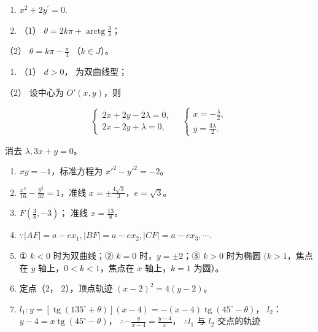 \begin{enumerate}
\def\labelenumi{\arabic{enumi}.}
\item
  \(x^{2} + 2y^{\prime} = 0.\)
\item
  （1） \(\theta = 2k\pi + \operatorname{arctg} \frac{3}{4}\)；
\end{enumerate}

（2） \(\theta = k\pi - \frac{\pi}{4}\) （\(k \in J\)）。

\begin{enumerate}
\def\labelenumi{\arabic{enumi}.}
\setcounter{enumi}{2}
\tightlist
\item
  （1） \(d > 0\)， 为双曲线型；
\end{enumerate}

（2） 设中心为 \(O'(x, y)\)，则

\[
\left\{ \begin{array}{l} 2 x + 2 y - 2 \lambda = 0, \\ 2 x - 2 y + \lambda = 0, \end{array} \right. \quad \left\{ \begin{array}{l} x = - \frac {\lambda}{2}, \\ y = \frac {3 \lambda}{2}. \end{array} \right.
\]

消去 \(\lambda, 3x + y = 0\)。

\begin{enumerate}
\def\labelenumi{\arabic{enumi}.}
\setcounter{enumi}{3}
\item
  \(xy = -1\)，标准方程为 \(x'^2 - y'^2 = -2\)。
\item
  \(\frac{x^2}{16} - \frac{y^2}{32} = 1\)，准线
  \(x = \pm \frac{4\sqrt{3}}{3}\)，\(e = \sqrt{3}\)。
\item
  \(F\left(\frac{3}{8}, -3\right)\)； 准线 \(x = \frac{13}{8}\)。
\item
  \(\because |AF| = a - ex_1, |BF| = a - ex_2, |CF| = a - ex_3, \cdots.\)
\item
  ① \(k < 0\) 时为双曲线；② \(k = 0\) 时，\(y = \pm 2\)；③ \(k > 0\)
  时为椭圆 \((k > 1\)，焦点在 \(y\) 轴上，\(0 < k < 1\)，焦点在 \(x\)
  轴上，\(k = 1\) 为圆）。
\item
  定点（2， 2），顶点轨迹 \((x-2)^{2}=4(y-2)\)。
\item
  \(l_{1}: y = [\operatorname{tg}(135^{\circ} + \theta)](x - 4) = -(x - 4)\operatorname{tg}(45^{\circ} - \theta)\)，
  \(l_{2}\)： \(y-4=x\operatorname{tg}(45^{\circ}-\theta)\)，
  \(\therefore -\frac{y}{x-4}=\frac{y-4}{x}\)， \(\therefore l_{1}\) 与
  \(l_{2}\) 交点的轨迹
\end{enumerate}

